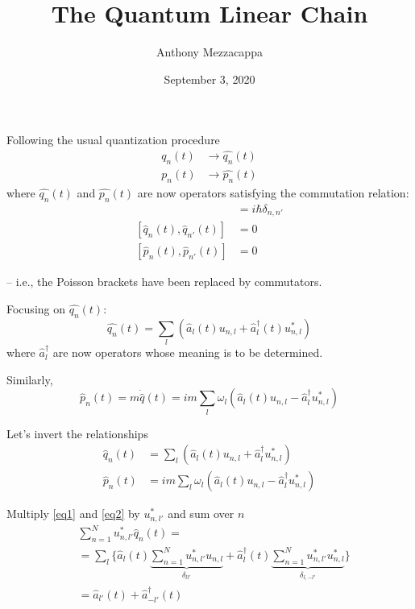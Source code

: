 \documentclass{article}
\title{The Quantum Linear Chain}
\author{Anthony Mezzacappa}
\date{September 3, 2020}
\begin{document}
\maketitle

\noindent Following the usual quantization procedure
\begin{align*}
    q_n(t) &\longrightarrow \hat{q_n}(t) \\
    p_n(t) &\longrightarrow \hat{p_n}(t)
\end{align*}
where $\hat{q_n}(t)$ and $\hat{p_n}(t)$ are now operators satisfying the commutation relation:
\begin{align*}
    [ \hat{q_n} (t), \hat{p_{n'}}(t)] &= i\hbar \delta_{n,n'} \\
    [ \hat{q}_n (t), \hat{q}_{n'} (t) ] &= 0 \\
    [ \hat{p}_n (t), \hat{p}_{n'} (t) ] &= 0 
\end{align*}

\noindent -- i.e., the Poisson brackets have been replaced by commutators.

\noindent Focusing on $\hat{q_n} (t)$:
\begin{equation*}
    \hat{q_n} (t) = \sum_l ( \hat{a}_l (t) u_{ n, l } + \hat{a}^\dagger_l (t) u^*_{n, l} )
\end{equation*}
where $\hat{a}^\dagger_l$ are now operators whose meaning is to be determined.

\noindent Similarly,
\begin{equation*}
    \hat{p}_n (t) = m \Dot{\hat{q}} (t) = i m \sum_l \omega_l \left( \hat{a}_l (t) u_{ n, l } - \hat{a}^\dagger_l u^*_{ n, l }  \right)
\end{equation*}


\noindent Let's invert the relationships
\begin{align}
    \hat{q}_n (t) &= \sum_l \left( \hat{a}_l (t) u_{ n, l } + \hat{a}^\dagger_l u^*_{ n, l } \right) \label{eq1} \\ %
    \hat{p}_n (t) &= i m \sum_l \omega_l \left( \hat{a}_l (t) u_{ n, l } - \hat{a}^\dagger_l u^*_{ n, l } \right) \label{eq2} %
\end{align}

\noindent Multiply \eqref{eq1} and \eqref{eq2} by $ u^*_{ n, l' } $ and sum over $n$
\begin{align}
    & \sum_{ n = 1 }^N u^*_{ n, l' } \hat{q}_n (t) = \nonumber \\
    &= \sum_l \biggl\lbrace \hat{a}_l (t) {\underbrace{ \sum_{ n = 1 }^N u^*_{ n, l' } u_{ n, l } }_{\delta_{ l l' } }} + \hat{a}^\dagger_l (t) {\underbrace{ \sum_{ n = 1 }^N u^*_{ n, l' } u^*_{ n, l } }_{ \delta_{ l, -l' } }} \biggr\rbrace \nonumber \\
    &= \hat{a}_{l'} (t) + \hat{a}^\dagger_{-l'} (t) \label{eq3} %
\end{align}
\end{document}
